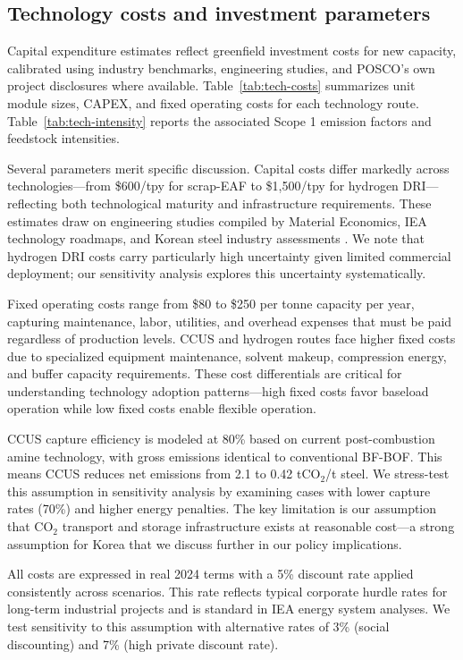 \subsection{Technology costs and investment parameters}

Capital expenditure estimates reflect greenfield investment costs for new capacity, calibrated using industry benchmarks, engineering studies, and POSCO's own project disclosures where available. Table~\ref{tab:tech-costs} summarizes unit module sizes, CAPEX, and fixed operating costs for each technology route. Table~\ref{tab:tech-intensity} reports the associated Scope 1 emission factors and feedstock intensities.

Several parameters merit specific discussion. Capital costs differ markedly across technologies—from \$600/tpy for scrap-EAF to \$1,500/tpy for hydrogen DRI—reflecting both technological maturity and infrastructure requirements. These estimates draw on engineering studies compiled by Material Economics, IEA technology roadmaps, and Korean steel industry assessments \citep{MaterialEconomics2019,kuramochi2018beyond,prammer2021steel}. We note that hydrogen DRI costs carry particularly high uncertainty given limited commercial deployment; our sensitivity analysis explores this uncertainty systematically.

Fixed operating costs range from \$80 to \$250 per tonne capacity per year, capturing maintenance, labor, utilities, and overhead expenses that must be paid regardless of production levels. CCUS and hydrogen routes face higher fixed costs due to specialized equipment maintenance, solvent makeup, compression energy, and buffer capacity requirements. These cost differentials are critical for understanding technology adoption patterns—high fixed costs favor baseload operation while low fixed costs enable flexible operation.

CCUS capture efficiency is modeled at 80\% based on current post-combustion amine technology, with gross emissions identical to conventional BF-BOF. This means CCUS reduces net emissions from 2.1 to 0.42 tCO$_2$/t steel. We stress-test this assumption in sensitivity analysis by examining cases with lower capture rates (70\%) and higher energy penalties. The key limitation is our assumption that CO$_2$ transport and storage infrastructure exists at reasonable cost—a strong assumption for Korea that we discuss further in our policy implications.

All costs are expressed in real 2024 terms with a 5\% discount rate applied consistently across scenarios. This rate reflects typical corporate hurdle rates for long-term industrial projects and is standard in IEA energy system analyses. We test sensitivity to this assumption with alternative rates of 3\% (social discounting) and 7\% (high private discount rate).



